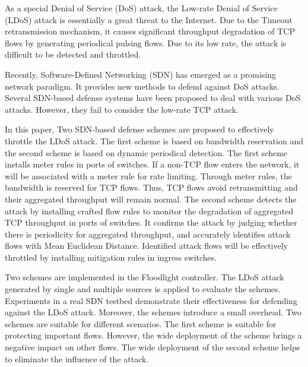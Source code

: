 \begin{eabstract}
  As a special Denial of Service (DoS) attack, the Low-rate Denial of Service (LDoS) attack is essentially a great threat to the Internet. Due to the Timeout retransmission mechanism, it causes significant throughput degradation of TCP flows by generating periodical pulsing flows. Due to its low rate, the attack is difficult to be detected and throttled.

  Recently, Software-Defined Networking (SDN) has emerged as a promising network paradigm. It provides new methods to defend against DoS attacks. Several SDN-based defense systems have been proposed to deal with various DoS attacks. However, they fail to consider the low-rate TCP attack.

  In this paper, Two SDN-based defense schemes are proposed to effectively throttle the LDoS attack. The first scheme is based on bandwidth reservation and the second scheme is based on dynamic periodical detection. The first scheme installs meter rules in ports of switches. If a non-TCP flow enters the network, it will be associated with a meter rule for rate limiting. Through meter rules, the bandwidth is reserved for TCP flows. Thus, TCP flows avoid retransmitting and their aggregated throughput will remain normal. The second scheme detects the attack by installing crafted flow rules to monitor the degradation of aggregated TCP throughput in ports of switches. It confirms the attack by judging whether there is periodicity for aggregated throughput, and accurately identifies attack flows with Mean Euclidean Distance. Identified attack flows will be effectively throttled by installing mitigation rules in ingress switches.

  Two schemes are implemented in the Floodlight controller. The LDoS attack generated by single and multiple sources is applied to evaluate the schemes. Experiments in a real SDN testbed demonstrate their effectiveness for defending against the LDoS attack. Moreover, the schemes introduce a small overhead. Two schemes are suitable for different scenarios. The first scheme is suitable for protecting important flows. However, the wide deployment of the scheme brings a negative impact on other flows. The wide deployment of the second scheme helps to eliminate the influence of the attack.

\end{eabstract}

